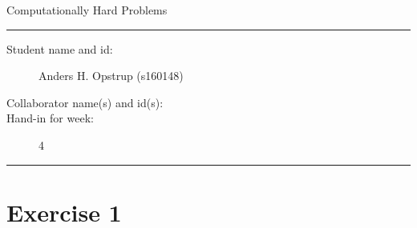 \documentclass[11pt]{article}
\begin{document}
\begin{center}
{{\Large \sc Computationally Hard Problems}}
\end{center}
\rule{\textwidth}{1pt}
\begin{description}
\item[Student name and id:] Anders H. Opstrup (s160148)
\item[Collaborator name(s) and id(s):]
\item[Hand-in for week:] 4
\end{description}
\rule{\textwidth}{1pt}

\section*{Exercise 1}
\end{document}
